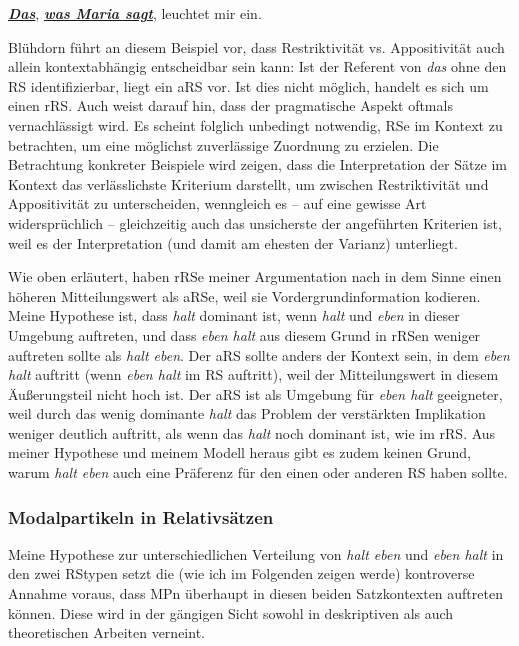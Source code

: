 \begin{exe}
	\ex\label{731} 
	\underline{\textit{\textbf{Das}}}, \underline{\textbf{\textit{was Maria sagt}}}, leuchtet mir ein.
	\hfill\hbox {\citet[27]{Bluehdorn2007}}
\end{exe}										           
Blühdorn führt an diesem Beispiel vor, dass Restriktivität vs. Appositivität auch allein kontextabhängig entscheidbar sein kann: Ist der Referent von \textit{das} ohne den RS identifizierbar, liegt ein aRS vor. Ist dies nicht möglich, handelt es sich um einen rRS. Auch \citet[193-194]{Schaffranietz1997} weist darauf hin, dass der pragmatische Aspekt oftmals vernachlässigt wird. Es scheint folglich unbedingt notwen\-dig, RSe im Kontext zu betrachten, um eine möglichst zuverlässige Zuordnung zu erzielen. Die Betrachtung konkreter Beispiele wird zeigen, dass die Interpretation der Sätze im Kontext das verlässlichste Kriterium darstellt, um zwischen Restriktivität und Appositivität zu unterscheiden, wenngleich es – auf eine gewisse Art widersprüchlich – gleichzeitig auch das unsicherste der angeführten Kriterien ist, weil es der Interpretation (und damit am ehesten der Varianz) unterliegt.

Wie oben erläutert, haben rRSe meiner Argumentation nach in dem Sinne einen höheren Mitteilungswert als aRSe, weil sie Vordergrundinformation kodie\-ren. Meine Hypothese ist, dass \textit{halt} dominant ist, wenn \textit{halt} und \textit{eben} in dieser Umgebung auftreten, und dass \textit{eben halt} aus diesem Grund in rRSen weniger auftreten sollte als \textit{halt eben}. Der aRS sollte anders der Kontext sein, in dem \textit{eben halt} auftritt (wenn \textit{eben halt} im RS auftritt), weil der Mitteilungswert in diesem Äußerungsteil nicht hoch ist. Der aRS ist als Umgebung für \textit{eben halt} geeigneter, weil durch das wenig dominante \textit{halt} das Problem der verstärkten Implikation weniger deutlich auftritt, als wenn das \textit{halt} noch dominant ist, wie im rRS. Aus meiner Hypothese und meinem Modell heraus gibt es zudem keinen Grund, warum \textit{halt eben} auch eine Präferenz für den einen oder anderen RS haben sollte.

\subsubsection{Modalpartikeln in Relativsätzen} 
\label{sec:mpnrs}
Meine Hypothese zur unterschiedlichen Verteilung von \textit{halt eben} und \textit{eben halt} in den zwei RStypen setzt die (wie ich im Folgenden zeigen werde) kontroverse Annahme voraus, dass MPn überhaupt in diesen beiden Satzkontexten auftreten können. Diese wird in der gängigen Sicht sowohl in deskriptiven als auch theoretischen Arbeiten verneint.

